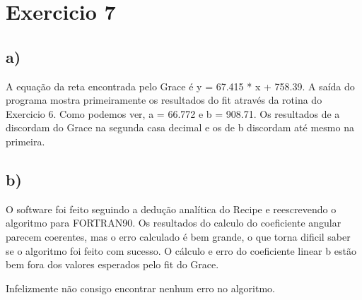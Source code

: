 \documentclass[a4wide]{report}
\begin{document}
\section*{Exercicio 7}
\subsection*{a)}
A equação da reta encontrada pelo Grace é y = 67.415 * x + 758.39.
A saída do programa mostra primeiramente os resultados do fit através da rotina do Exercicio 6. Como podemos ver, a = 66.772 e b = 908.71. Os resultados de a discordam do Grace na segunda casa decimal e os de b discordam até mesmo na primeira.

\subsection*{b)}
O software foi feito seguindo a dedução analítica do Recipe e reescrevendo o algoritmo para FORTRAN90. Os resultados do calculo do coeficiente angular parecem coerentes, mas o erro calculado é bem grande, o que torna dificil saber se o algoritmo foi feito com sucesso.  O cálculo e erro do coeficiente linear b estão bem fora dos valores esperados pelo fit do Grace.

Infelizmente não consigo encontrar nenhum erro no algoritmo.
\end{document}
